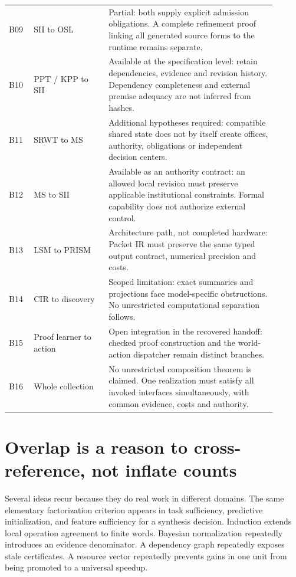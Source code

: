 \documentclass[11pt,oneside]{article}
\begin{document}
\begin{longtable}{@{}p{0.08\linewidth}p{0.25\linewidth}p{0.57\linewidth}@{}}
B09 & SII to OSL & Partial: both supply explicit admission obligations. A complete refinement proof linking all generated source forms to the runtime remains separate.\\
B10 & PPT / KPP to SII & Available at the specification level: retain dependencies, evidence and revision history. Dependency completeness and external premise adequacy are not inferred from hashes.\\
B11 & SRWT to MS & Additional hypotheses required: compatible shared state does not by itself create offices, authority, obligations or independent decision centers.\\
B12 & MS to SII & Available as an authority contract: an allowed local revision must preserve applicable institutional constraints. Formal capability does not authorize external control.\\
B13 & LSM to PRISM & Architecture path, not completed hardware: Packet IR must preserve the same typed output contract, numerical precision and costs.\\
B14 & CIR to discovery & Scoped limitation: exact summaries and projections face model-specific obstructions. No unrestricted computational separation follows.\\
B15 & Proof learner to action & Open integration in the recovered handoff: checked proof construction and the world-action dispatcher remain distinct branches.\\
B16 & Whole collection & No unrestricted composition theorem is claimed. One realization must satisfy all invoked interfaces simultaneously, with common evidence, costs and authority.\\\bottomrule
\end{longtable}
\normalsize

\section{Overlap is a reason to cross-reference, not inflate counts}
Several ideas recur because they do real work in different domains. The same elementary factorization criterion appears in task sufficiency, predictive initialization, and feature sufficiency for a synthesis decision. Induction extends local operation agreement to finite words. Bayesian normalization repeatedly introduces an evidence denominator. A dependency graph repeatedly exposes stale certificates. A resource vector repeatedly prevents gains in one unit from being promoted to a universal speedup.
\end{document}
